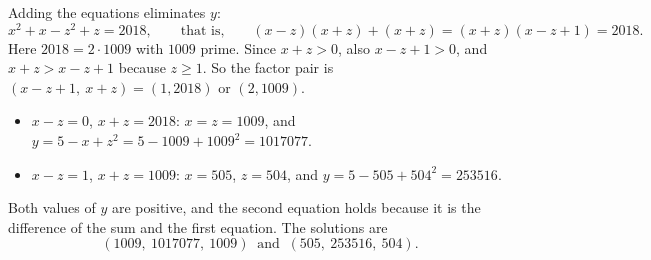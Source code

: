 Adding the equations eliminates $y$:
\[x^2+x-z^2+z=2018,\qquad\text{that is,}\qquad (x-z)(x+z)+(x+z)=(x+z)(x-z+1)=2018 .\]
Here $2018=2\cdot1009$ with $1009$ prime. Since $x+z>0$, also $x-z+1>0$, and $x+z>x-z+1$ because $z\ge1$. So the factor pair is $(x-z+1,\ x+z)=(1,2018)$ or $(2,1009)$.
\begin{itemize}
\item $x-z=0$, $x+z=2018$: $x=z=1009$, and $y=5-x+z^2=5-1009+1009^2=1017077$.
\item $x-z=1$, $x+z=1009$: $x=505$, $z=504$, and $y=5-505+504^2=253516$.
\end{itemize}
Both values of $y$ are positive, and the second equation holds because it is the difference of the sum and the first equation. The solutions are
\[\boxed{(1009,\ 1017077,\ 1009)\ \text{ and }\ (505,\ 253516,\ 504)} .\]
